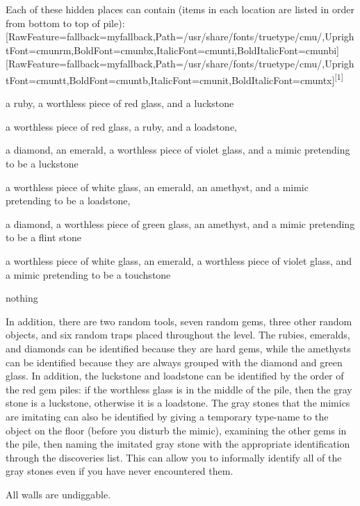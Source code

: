 Each of these hidden places can contain (items in each location are listed in order from bottom to top of pile):\allowbreak{}\setmainfont{cmunrm.ttf}[RawFeature={fallback=myfallback},Path=/usr/share/fonts/truetype/cmu/,UprightFont=cmunrm,BoldFont=cmunbx,ItalicFont=cmunti,BoldItalicFont=cmunbi]\setmonofont{cmunrm.ttf}[RawFeature={fallback=myfallback},Path=/usr/share/fonts/truetype/cmu/,UprightFont=cmuntt,BoldFont=cmuntb,ItalicFont=cmunit,BoldItalicFont=cmuntx]\textsuperscript{{$\text{[}$}1{$\text{]}$}}


\begin{myitemize}
\item{}a ruby, a worthless piece of red glass, and a luckstone
\item{}a worthless piece of red glass, a ruby, and a loadstone,
\item{}a diamond, an emerald, a worthless piece of violet glass, and a mimic pretending to be a luckstone
\item{}a worthless piece of white glass, an emerald, an amethyst, and a mimic pretending to be a loadstone,
\item{}a diamond, a worthless piece of green glass, an amethyst, and a mimic pretending to be a flint stone
\item{}a worthless piece of white glass, an emerald, a worthless piece of violet glass, and a mimic pretending to be a touchstone
\item{}nothing
\end{myitemize}

In addition, there are two random tools, seven random gems, three other random objects, and six random traps placed throughout the level. The rubies, emeralds, and diamonds can be identified because they are hard gems, while the amethysts can be identified because they are always grouped with the diamond and green glass.  In addition, the luckstone and loadstone can be identified by the order of the red gem piles: if the worthless glass is in the middle of the pile, then the gray stone is a luckstone, otherwise it is a loadstone.  The gray stones that the mimics are imitating can also be identified by giving a temporary type-{}name to the object on the floor (before you disturb the mimic), examining the other gems in the pile, then naming the imitated gray stone with the appropriate identification through the discoveries list.  This can allow you to informally identify all of the gray stones even if you have never encountered them.

All walls are undiggable.

